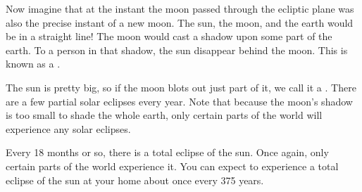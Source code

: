 Now imagine that at the instant the moon passed through the ecliptic plane was also the precise instant of a new moon.    The sun,  the moon, and the earth would be in a straight line!  The moon would cast a shadow upon some part of the earth.  To a person in that shadow,  the sun disappear behind the moon.   This is known as a .

The sun is pretty big,  so if the moon blots out just part of it,  we call it a .  There are a few partial solar eclipses every year.   Note that because the moon's shadow is too small to shade the whole earth,   only certain parts of the world will experience any solar eclipses. 

Every 18 months or so,  there is a total eclipse of the sun.  Once again,  only certain parts of the world experience it.   You can expect to experience a total eclipse of the sun at your home about once every 375 years.
 

